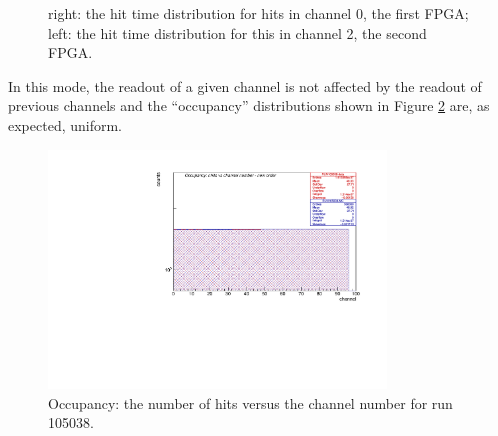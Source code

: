 \begin{figure}[H]
  \hspace{-0.5in}
  \caption{
    \label{fig:4}
    right: the hit time distribution for hits in channel 0, the first FPGA;
    left: the hit time distribution for this in channel 2, the second FPGA.
  }
\end{figure}
In this mode, the readout of a given channel is not affected by the readout of previous
channels and the ``occupancy'' distributions shown in Figure \ref{fig:5} are, as expected, uniform.
\begin{figure}[H]
\centering
\includegraphics[width =0.8\textwidth]{figures/pdf/figure_00002_nhitsvschannel_roc_simulation_2}
\caption{Occupancy: the number of hits versus the channel number for run 105038.}
\label{fig:5}
\end{figure}


